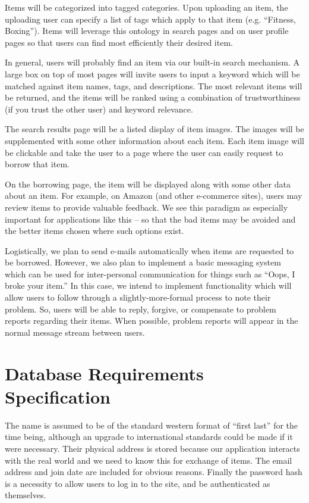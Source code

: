 \documentclass{acm_proc_article-sp}
\begin{document}
Items will be categorized into tagged categories. Upon uploading an item, the uploading user can specify a list of tags which apply to that item (e.g. ``Fitness, Boxing''). Items will leverage this ontology in search pages and on user profile pages so that users can find most efficiently their desired item.

In general, users will probably find an item via our built-in search mechanism. A large box on top of most pages will invite users to input a keyword which will be matched against item names, tags, and descriptions. The most relevant items will be returned, and the items will be ranked using a combination of trustworthiness (if you trust the other user) and keyword relevance.

The search results page will be a listed display of item images. The images will be supplemented with some other information about each item. Each item image will be clickable and take the user to a page where the user can easily request to borrow that item.

On the borrowing page, the item will be displayed along with some other data about an item. For example, on Amazon (and other e-commerce sites), users may review items to provide valuable feedback. We see this paradigm as especially important for applications like this -- so that the bad items may be avoided and the better items chosen where such options exist.

Logistically, we plan to send e-mails automatically when items are requested to be borrowed. However, we also plan to implement a basic messaging system which can be used for inter-personal communication for things such as ``Oops, I broke your item.'' In this case, we
intend to implement functionality which will allow users to follow through a slightly-more-formal process to note their problem. So, users will be able to reply, forgive, or compensate to problem reports regarding their items. When possible, problem reports will appear in the normal message stream between users.

\section{Database Requirements Specification}
The name is assumed to be of the standard western format of ``first last'' for the time being, although an upgrade to international standards could be made if it were necessary. Their physical address is stored because our application interacts with the real world and we need to know this for exchange of items. The email address and join date are included for obvious reasons. Finally the password hash is a necessity to allow users to log in to the site, and be authenticated as themselves.
\end{document}
